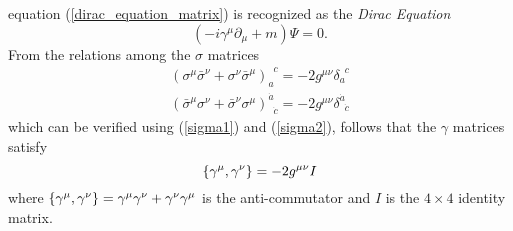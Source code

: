 equation (\ref{dirac_equation_matrix}) is recognized as the \textit{Dirac Equation}
\begin{equation}
    (-i\gamma^\mu\partial_\mu+m)\Psi=0.
\end{equation}
From the relations among the $\sigma$ matrices
\begin{equation}
\begin{array}{l}
\left(\sigma^{\mu} \bar{\sigma}^{\nu}+\sigma^{\nu} \bar{\sigma}^{\mu}\right)_{a}^{\phantom{a}c}=-2 g^{\mu \nu} \delta_{a}^{\phantom{a}c} \\
\left(\bar{\sigma}^{\mu} \sigma^{\nu}+\bar{\sigma}^{\nu} \sigma^{\mu}\right)^{\dot{a}}_{\phantom{a}\dot{c}}=-2 g^{\mu \nu} \delta^{\dot{a}}_{\phantom{a}\dot{c}}
\end{array}
\end{equation}
which can be verified using (\ref{sigma1}) and (\ref{sigma2}), follows that the $\gamma$ matrices satisfy
\begin{equation}
    \pb{\gamma^\mu}{\gamma^\nu}=-2g^{\mu\nu}I
\end{equation}
where $\pb{\gamma^\mu}{\gamma^\nu}=\gamma^\mu\gamma^\nu+\gamma^\nu\gamma^\mu$ is the anti-commutator and $I$ is the $4\times4$ identity matrix.\\

